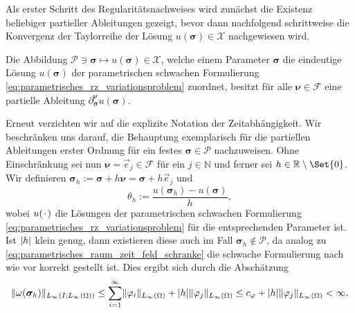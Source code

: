 \documentclass[../main.tex]{subfiles}
\begin{document}
Als erster Schritt des Regularitätsnachweises wird zunächst die Existenz beliebiger partieller Ableitungen gezeigt, bevor dann nachfolgend schrittweise die Konvergenz der Taylorreihe der Lösung $u(\bm \sigma) \in \mathcal X$ nachgewiesen wird.

\begin{Satz}
\label{satz:existenz_partieller_ableitungen}
    Die Abbildung $\mathcal P \ni \bm\sigma \mapsto u(\bm\sigma) \in \mathcal X$, welche einem Parameter $\bm\sigma$ die eindeutige Lösung $u(\bm\sigma)$ der parametrischen schwachen Formulierung \cref{eq:parametrisches_rz_variationsproblem} zuordnet, besitzt für alle $\bm\nu \in \mathcal F$ eine partielle Ableitung $\partial^{\bm\nu}_{\bm\sigma} u(\bm\sigma)$.

    \begin{Beweis}
        Erneut verzichten wir auf die explizite Notation der Zeitabhängigkeit.
        Wir beschränken uns darauf, die Behauptung exemplarisch für die partiellen Ableitungen erster Ordnung für ein festes $\bm\sigma \in \mathcal P$ nachzuweisen.
        Ohne Einschränkung sei nun $\bm\nu = \vec{e}_{j} \in \mathcal F$ für ein $j \in \mathbb{N}$ und ferner sei $h \in \mathbb{R} \setminus \Set{ 0 }$.
        Wir definieren $\bm\sigma_{h} := \bm\sigma + h \bm\nu = \bm\sigma + h \vec e_{j}$ und
        \begin{equation}
            \theta_{h} := \frac{u(\bm\sigma_{h}) - u(\bm\sigma)}{h},
        \end{equation}
        wobei $u({\mkern2mu\cdot\mkern2mu})$ die Lösungen der parametrischen schwachen Formulierung \cref{eq:parametrisches_rz_variationsproblem} für die entsprechenden Parameter ist.
        Ist $\lvert h\rvert$ klein genug, dann existieren diese auch im Fall $\bm\sigma_{h} \not\in \mathcal P$, da analog zu \cref{eq:parametrisches_raum_zeit_feld_schranke} die schwache Formulierung nach wie vor korrekt gestellt ist.
        Dies ergibt sich durch die Abschätzung
        \begin{equation}
            \lVert\omega(\bm \sigma_{h})\rVert_{L_{\infty}(I; L_{\infty}(\Omega))} \leq \sum_{i = 1}^{\infty} \lVert\varphi_{i}\rVert_{L_{\infty}(\Omega)} + \lvert h\rvert \lVert\varphi_{j}\rVert_{L_{\infty}(\Omega)}\leq c_{\varphi} + \lvert h\rvert \lVert\varphi_{j}\rVert_{L_{\infty}(\Omega)} < \infty.
        \end{equation}


\end{Beweis}
\end{Satz}
\end{document}
